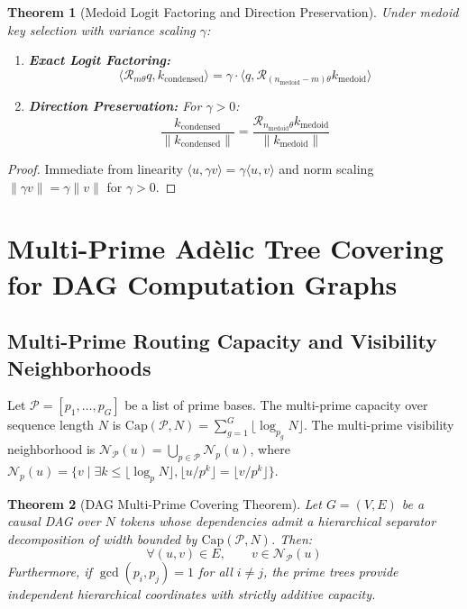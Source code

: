 \documentclass[11pt,reqno]{article}
\theoremstyle{plain}
\newtheorem{theorem}{Theorem}[section]
\theoremstyle{definition}
\theoremstyle{remark}
\newcommand{\Capac}{\mathrm{Cap}}
\begin{document}
\begin{theorem}[Medoid Logit Factoring and Direction Preservation]
\label{thm:medoid_scaling}
Under medoid key selection with variance scaling $\gamma$:
\begin{enumerate}
    \item \textbf{Exact Logit Factoring:}
    \[
    \langle \mathcal{R}_{m\theta} q, k_{\mathrm{condensed}} \rangle = \gamma \cdot \langle q, \mathcal{R}_{(n_{\mathrm{medoid}} - m)\theta} k_{\mathrm{medoid}} \rangle
    \]
    \item \textbf{Direction Preservation:} For $\gamma > 0$:
    \[
    \frac{k_{\mathrm{condensed}}}{\|k_{\mathrm{condensed}}\|} = \frac{\mathcal{R}_{n_{\mathrm{medoid}}\theta} k_{\mathrm{medoid}}}{\|k_{\mathrm{medoid}}\|}
    \]
\end{enumerate}
\end{theorem}

\begin{proof}
Immediate from linearity $\langle u, \gamma v \rangle = \gamma \langle u, v \rangle$ and norm scaling $\|\gamma v\| = \gamma \|v\|$ for $\gamma > 0$.
\end{proof}

\section{Multi-Prime Adèlic Tree Covering for DAG Computation Graphs}

\subsection{Multi-Prime Routing Capacity and Visibility Neighborhoods}

Let $\mathcal{P} = [p_1, \dots, p_G]$ be a list of prime bases. The multi-prime capacity over sequence length $N$ is $\Capac(\mathcal{P}, N) = \sum_{g=1}^G \lfloor \log_{p_g} N \rfloor$. The multi-prime visibility neighborhood is $\mathcal{N}_{\mathcal{P}}(u) = \bigcup_{p \in \mathcal{P}} \mathcal{N}_p(u)$, where $\mathcal{N}_p(u) = \{ v \mid \exists k \le \lfloor \log_p N \rfloor, \lfloor u / p^k \rfloor = \lfloor v / p^k \rfloor \}$.

\begin{theorem}[DAG Multi-Prime Covering Theorem]
\label{thm:dag_cover}
Let $G = (V, E)$ be a causal DAG over $N$ tokens whose dependencies admit a hierarchical separator decomposition of width bounded by $\Capac(\mathcal{P}, N)$. Then:
\[
\forall (u, v) \in E, \qquad v \in \mathcal{N}_{\mathcal{P}}(u)
\]
Furthermore, if $\gcd(p_i, p_j) = 1$ for all $i \neq j$, the prime trees provide independent hierarchical coordinates with strictly additive capacity.
\end{theorem}
\end{document}
